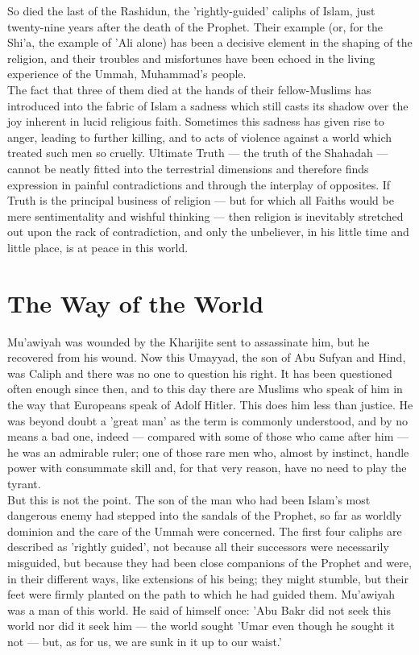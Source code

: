 \documentclass[10pt, twoside]{book}
\begin{document}
So died the last of the Rashidun, the 'rightly\hyp{}guided' caliphs of Islam, just twenty-nine years after the death of the Prophet. Their example (or, for the Shi'a, the example of 'Ali alone) has been a decisive element in the shaping of the religion, and their troubles and misfortunes have been echoed in the living experience of the Ummah, Muhammad's people. \\

The fact that three of them died at the hands of their fellow\hyp{}Muslims has introduced into the fabric of Islam a sadness which still casts its shadow over the joy inherent in lucid religious faith. Sometimes this sadness has given rise to anger, leading to further killing, and to acts of violence against a world which treated such men so cruelly. Ultimate Truth --- the truth of the Shahadah --- cannot be neatly fitted into the terrestrial dimensions and therefore finds expression in painful contradictions and through the interplay of opposites. If Truth is the principal business of religion --- but for which all Faiths would be mere sentimentality and wishful thinking --- then religion is inevitably stretched out upon the rack of contradiction, and only the unbeliever, in his little time and little place, is at peace in this world. \\


\chapter{The Way of the World}

Mu'awiyah was wounded by the Kharijite sent to assassinate him, but he recovered from his wound. Now 
this Umayyad, the son of Abu Sufyan and Hind, was Caliph and there was no one to question his right. 
It has been questioned often enough since then, and to this day there are Muslims who speak of him in 
the way that Europeans speak of Adolf Hitler. This does him less than justice. He was beyond doubt a 
'great man' as the term is commonly understood, and by no means a bad one, indeed --- compared with 
some of those who came after him --- he was an admirable ruler; one of those rare men who, almost by 
instinct, handle power with consummate skill and, for that very reason, have no need to play the 
tyrant. \\

But this is not the point. The son of the man who had been Islam's most dangerous enemy had stepped 
into the sandals of the Prophet, so far as worldly dominion and the care of the Ummah were concerned. 
The first four caliphs are described as 'rightly guided', not because all their successors were 
necessarily misguided, but because they had been close companions of the Prophet and were, in their 
different ways, like extensions of his being; they might stumble, but their feet were firmly planted 
on the path to which he had guided them. Mu'awiyah was a man of this world. He said of himself once: 
'Abu Bakr did not seek this world nor did it seek him --- the world sought 'Umar even though he sought 
it not --- but, as for us, we are sunk in it up to our waist.' \\
\end{document}

